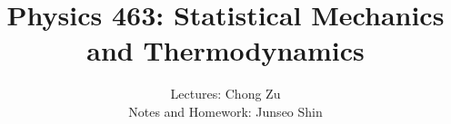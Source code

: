 \documentclass{article}
\author{Lectures: Chong Zu \\ Notes and Homework: Junseo Shin}
\date{}
\title{Physics 463: Statistical Mechanics and Thermodynamics}
\begin{document}
\maketitle
\tableofcontents
\pagebreak



\end{document}
